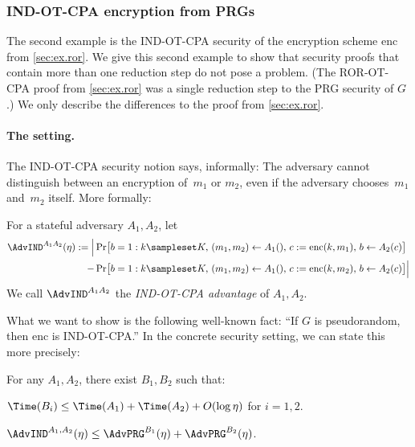 \documentclass{article}
\begin{document}



\subsubsection{IND-OT-CPA encryption from PRGs}
\label{sec:ex.ind}

The second example is the IND-OT-CPA security of the encryption scheme
$\mathrm{enc}$
from \autoref{sec:ex.ror}.  We give this second example to show that
security proofs that contain more than one reduction step do not pose
a problem. (The ROR-OT-CPA proof from \autoref{sec:ex.ror} was a
single reduction step to the PRG security of $G$.)
We only describe the differences to the proof from
\autoref{sec:ex.ror}.

\paragraph{The setting.}
The IND-OT-CPA security notion says,
informally: The adversary cannot distinguish between an encryption
of~$m_1$ or $m_2$, even if the adversary
chooses~$m_1$ and~$m_2$ itself. More formally:
\begin{definition}\label{def:indadv}
  For a stateful adversary $A_1,A_2$, let \symbolindexmark\AdvIND
  \begin{align*}
    \AdvIND^{A_1A_2}(\eta) :=
    \Bigl\lvert
    &\Pr\bigl[b=1:
        k\sampleset K,\, (m_1,m_2)\leftarrow A_1(),\, c:=\mathrm{enc}(k,m_1),\, b\leftarrow A_2(c)\bigr]
    \\    -
     &\Pr\bigl[b=1:
       k\sampleset K,\, (m_1,m_2)\leftarrow A_1(),\, c:=\mathrm{enc}(k,m_2),\, b\leftarrow A_2(c)\bigr]
       \Bigr\rvert      
  \end{align*}
  We call $\AdvIND^{A_1A_2}$ the \emph{IND-OT-CPA advantage}%
  of $A_1,A_2$.
\end{definition}

What we want to show is the following well-known fact: ``If $G$
is pseudorandom, then $\mathrm{enc}$
is IND-OT-CPA.'' In the concrete security setting, we can state this
more precisely:
\begin{lemma}\label{lemma:indcpa}
  For any $A_1,A_2$, there exist $B_1,B_2$ such that:
  \begin{compactenum}[(i)]
  \item\label{item:time.ind} $\Time(B_i) \leq \Time(A_1) + \Time(A_2) + O(\log \eta)$ for $i=1,2$.
  \item\label{item:adv.ind} $\AdvIND^{A_1,A_2}(\eta) \leq \AdvPRG^{B_1}(\eta) +  \AdvPRG^{B_2}(\eta)$.
  \end{compactenum}
\end{lemma}
\end{document}
